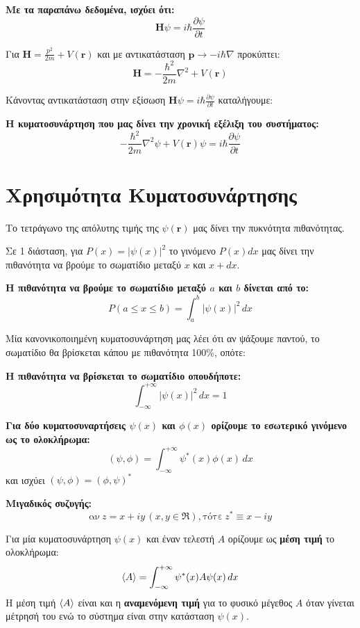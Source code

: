 \documentclass[11pt, oneside]{article}   	%
\newcommand{\definition}[1]{
	\begin{tcolorbox}[colback=blue!5!white,colframe=blue!75!black,title=\textbf{Ορισμός}]
		\begin{center}
			#1
		\end{center}
	\end{tcolorbox}
}
\newcommand{\suggestion}[1]{
	\begin{tcolorbox}[colback=green!5!white,colframe=green!75!black,title=\textbf{Πρόταση}]
		\begin{center}
			#1
		\end{center}
	\end{tcolorbox}
}
\newcommand{\note}[1]{
	\begin{tcolorbox}[colback=yellow!5!white,colframe=yellow!75!black,title=\textbf{Σημείωση}]
		\begin{center}
			#1
		\end{center}
	\end{tcolorbox}
}
\begin{document}
\suggestion{\textbf{Με τα παραπάνω δεδομένα, ισχύει ότι:} \[\mathbf{H}\psi = i \hbar \frac{\partial \psi}{\partial t}\]}

Για $\mathbf{H}=\frac{p^2}{2m}+V(\mathbf{r})$ και με αντικατάσταση $\mathbf{p} \rightarrow-i\hbar \nabla$ προκύπτει:
\[\mathbf{H}=-\frac{\hbar^2}{2m} \nabla^2 + V(\mathbf{r})\]

Κάνοντας αντικατάσταση στην εξίσωση $\mathbf{H}\psi = i \hbar \frac{\partial \psi}{\partial t}$ καταλήγουμε:

\definition{\textbf{Η κυματοσυνάρτηση που μας δίνει την χρονική εξέλιξη του συστήματος:}\[-\frac{\hbar^2}{2m}\nabla^2\psi + V(\mathbf{r})\psi = i\hbar \frac{\partial\psi}{\partial t}\]}

\section{Χρησιμότητα Κυματοσυνάρτησης}

Το τετράγωνο της απόλυτης τιμής της $\psi(\mathbf{r})$ μας δίνει την πυκνότητα πιθανότητας.

\suggestion{Σε 1 διάσταση, για $P(x)=|\psi(x)|^2$ το γινόμενο $P(x)dx$ μας δίνει την πιθανότητα να βρούμε το σωματίδιο μεταξύ $x$ και $x+dx$.}

\definition{\textbf{Η πιθανότητα να βρούμε το σωματίδιο μεταξύ $a$ και $b$ δίνεται από το:} \[P(a\leq x\leq b) = \int_{a}^{b} |\psi(x)|^2 \, dx\]}

Μία κανονικοποιημένη κυματοσυνάρτηση μας λέει ότι αν ψάξουμε παντού, το σωματίδιο θα βρίσκεται κάπου με πιθανότητα 100\%, οπότε:

\definition{\textbf{Η πιθανότητα να βρίσκεται το σωματίδιο οπουδήποτε:} \[\int_{-\infty}^{+\infty}|\psi(x)|^2 \, dx = 1\]}

\definition{\textbf{Για δύο κυματοσυναρτήσεις $\psi(x)$ και $\phi(x)$ ορίζουμε το εσωτερικό γινόμενο ως το ολοκλήρωμα:}\[(\psi,\phi) = \int_{-\infty}^{+\infty} \psi^*(x) \phi(x) \, dx\] και ισχύει $(\psi,\phi) = (\phi,\psi)^*$}

\note{\textbf{Μιγαδικός συζυγής:}\[\text{αν} \ z=x+iy \, (x,y \in \Re), \text{τότε} \ z^* \equiv x-iy\]}

\definition{Για μία κυματοσυνάρτηση $\psi(x)$ και έναν τελεστή $A$ ορίζουμε ως \textbf{μέση τιμή} το ολοκλήρωμα:\[\braket{A}=\int_{-\infty}^{+\infty} \psi^*(x) A \psi(x) \, dx\]
Η μέση τιμή $\braket{A}$ είναι και η \textbf{αναμενόμενη τιμή} για το φυσικό μέγεθος $A$ όταν γίνεται μέτρησή του ενώ το σύστημα είναι στην κατάσταση $\psi(x)$.}
\end{document}
